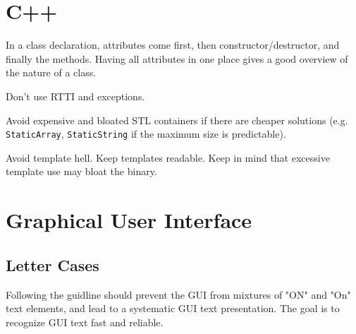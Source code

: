 \documentclass[a4paper,12pt]{refrep}
\begin{document}
\section{C++}

In a class declaration, attributes come first, then
constructor/destructor, and finally the methods.  Having all
attributes in one place gives a good overview of the nature of a
class.

Don't use RTTI and exceptions.

Avoid expensive and bloated STL containers if there are cheaper
solutions (e.g. \texttt{StaticArray}, \texttt{StaticString} if the
maximum size is predictable).

Avoid template hell.  Keep templates readable.  Keep in mind that
excessive template use may bloat the binary.

\section{Graphical User Interface}
\subsection{Letter Cases}

Following the guidline should prevent the GUI from mixtures of "ON" and "On" text elements, and lead to a systematic GUI text presentation. The goal is to recognize GUI text fast and reliable.
\end{document}
